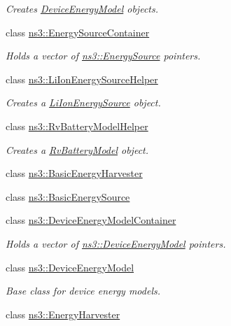 \begin{DoxyCompactItemize}
\begin{DoxyCompactList}\small\item\em Creates \hyperlink{classns3_1_1DeviceEnergyModel}{Device\+Energy\+Model} objects. \end{DoxyCompactList}\item 
class \hyperlink{classns3_1_1EnergySourceContainer}{ns3\+::\+Energy\+Source\+Container}
\begin{DoxyCompactList}\small\item\em Holds a vector of \hyperlink{classns3_1_1EnergySource}{ns3\+::\+Energy\+Source} pointers. \end{DoxyCompactList}\item 
class \hyperlink{classns3_1_1LiIonEnergySourceHelper}{ns3\+::\+Li\+Ion\+Energy\+Source\+Helper}
\begin{DoxyCompactList}\small\item\em Creates a \hyperlink{classns3_1_1LiIonEnergySource}{Li\+Ion\+Energy\+Source} object. \end{DoxyCompactList}\item 
class \hyperlink{classns3_1_1RvBatteryModelHelper}{ns3\+::\+Rv\+Battery\+Model\+Helper}
\begin{DoxyCompactList}\small\item\em Creates a \hyperlink{classns3_1_1RvBatteryModel}{Rv\+Battery\+Model} object. \end{DoxyCompactList}\item 
class \hyperlink{classns3_1_1BasicEnergyHarvester}{ns3\+::\+Basic\+Energy\+Harvester}
\item 
class \hyperlink{classns3_1_1BasicEnergySource}{ns3\+::\+Basic\+Energy\+Source}
\item 
class \hyperlink{classns3_1_1DeviceEnergyModelContainer}{ns3\+::\+Device\+Energy\+Model\+Container}
\begin{DoxyCompactList}\small\item\em Holds a vector of \hyperlink{classns3_1_1DeviceEnergyModel}{ns3\+::\+Device\+Energy\+Model} pointers. \end{DoxyCompactList}\item 
class \hyperlink{classns3_1_1DeviceEnergyModel}{ns3\+::\+Device\+Energy\+Model}
\begin{DoxyCompactList}\small\item\em Base class for device energy models. \end{DoxyCompactList}\item 
class \hyperlink{classns3_1_1EnergyHarvester}{ns3\+::\+Energy\+Harvester}

\end{DoxyCompactItemize}
